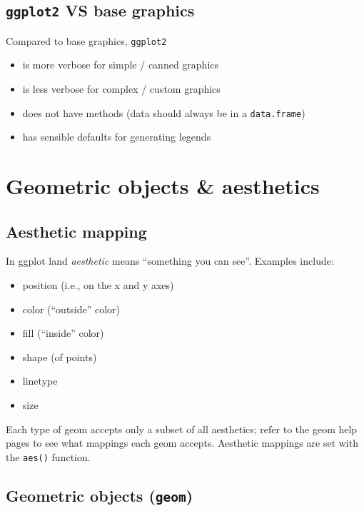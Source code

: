 \documentclass[]{book}
\providecommand{\tightlist}{%
  \setlength{\itemsep}{0pt}\setlength{\parskip}{0pt}}
\begin{document}
\hypertarget{ggplot2-vs-base-graphics}{%
\subsection{\texorpdfstring{\texttt{ggplot2} VS base graphics}{ggplot2 VS base graphics}}\label{ggplot2-vs-base-graphics}}

Compared to base graphics, \texttt{ggplot2}

\begin{itemize}
\tightlist
\item
  is more verbose for simple / canned graphics
\item
  is less verbose for complex / custom graphics
\item
  does not have methods (data should always be in a \texttt{data.frame})
\item
  has sensible defaults for generating legends
\end{itemize}

\hypertarget{geometric-objects-aesthetics}{%
\section{Geometric objects \& aesthetics}\label{geometric-objects-aesthetics}}

\hypertarget{aesthetic-mapping}{%
\subsection{Aesthetic mapping}\label{aesthetic-mapping}}

In ggplot land \emph{aesthetic} means ``something you can see''. Examples include:

\begin{itemize}
\tightlist
\item
  position (i.e., on the x and y axes)
\item
  color (``outside'' color)
\item
  fill (``inside'' color)
\item
  shape (of points)
\item
  linetype
\item
  size
\end{itemize}

Each type of geom accepts only a subset of all aesthetics; refer to the geom help pages to see what mappings each geom accepts. Aesthetic mappings are set with the \texttt{aes()} function.

\hypertarget{geometric-objects-geom}{%
\subsection{\texorpdfstring{Geometric objects (\texttt{geom})}{Geometric objects (geom)}}\label{geometric-objects-geom}}
\end{document}
